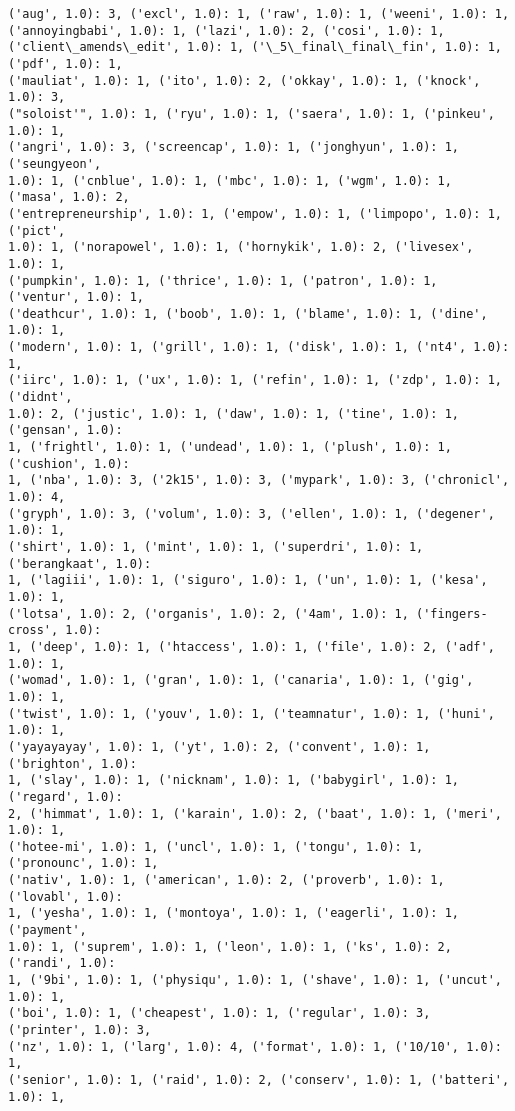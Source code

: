 \documentclass[11pt]{article}
\begin{document}
\begin{Verbatim}[commandchars=\\\{\}]
('aug', 1.0): 3, ('excl', 1.0): 1, ('raw', 1.0): 1, ('weeni', 1.0): 1,
('annoyingbabi', 1.0): 1, ('lazi', 1.0): 2, ('cosi', 1.0): 1,
('client\_amends\_edit', 1.0): 1, ('\_5\_final\_final\_fin', 1.0): 1, ('pdf', 1.0): 1,
('mauliat', 1.0): 1, ('ito', 1.0): 2, ('okkay', 1.0): 1, ('knock', 1.0): 3,
("soloist'", 1.0): 1, ('ryu', 1.0): 1, ('saera', 1.0): 1, ('pinkeu', 1.0): 1,
('angri', 1.0): 3, ('screencap', 1.0): 1, ('jonghyun', 1.0): 1, ('seungyeon',
1.0): 1, ('cnblue', 1.0): 1, ('mbc', 1.0): 1, ('wgm', 1.0): 1, ('masa', 1.0): 2,
('entrepreneurship', 1.0): 1, ('empow', 1.0): 1, ('limpopo', 1.0): 1, ('pict',
1.0): 1, ('norapowel', 1.0): 1, ('hornykik', 1.0): 2, ('livesex', 1.0): 1,
('pumpkin', 1.0): 1, ('thrice', 1.0): 1, ('patron', 1.0): 1, ('ventur', 1.0): 1,
('deathcur', 1.0): 1, ('boob', 1.0): 1, ('blame', 1.0): 1, ('dine', 1.0): 1,
('modern', 1.0): 1, ('grill', 1.0): 1, ('disk', 1.0): 1, ('nt4', 1.0): 1,
('iirc', 1.0): 1, ('ux', 1.0): 1, ('refin', 1.0): 1, ('zdp', 1.0): 1, ('didnt',
1.0): 2, ('justic', 1.0): 1, ('daw', 1.0): 1, ('tine', 1.0): 1, ('gensan', 1.0):
1, ('frightl', 1.0): 1, ('undead', 1.0): 1, ('plush', 1.0): 1, ('cushion', 1.0):
1, ('nba', 1.0): 3, ('2k15', 1.0): 3, ('mypark', 1.0): 3, ('chronicl', 1.0): 4,
('gryph', 1.0): 3, ('volum', 1.0): 3, ('ellen', 1.0): 1, ('degener', 1.0): 1,
('shirt', 1.0): 1, ('mint', 1.0): 1, ('superdri', 1.0): 1, ('berangkaat', 1.0):
1, ('lagiii', 1.0): 1, ('siguro', 1.0): 1, ('un', 1.0): 1, ('kesa', 1.0): 1,
('lotsa', 1.0): 2, ('organis', 1.0): 2, ('4am', 1.0): 1, ('fingers-cross', 1.0):
1, ('deep', 1.0): 1, ('htaccess', 1.0): 1, ('file', 1.0): 2, ('adf', 1.0): 1,
('womad', 1.0): 1, ('gran', 1.0): 1, ('canaria', 1.0): 1, ('gig', 1.0): 1,
('twist', 1.0): 1, ('youv', 1.0): 1, ('teamnatur', 1.0): 1, ('huni', 1.0): 1,
('yayayayay', 1.0): 1, ('yt', 1.0): 2, ('convent', 1.0): 1, ('brighton', 1.0):
1, ('slay', 1.0): 1, ('nicknam', 1.0): 1, ('babygirl', 1.0): 1, ('regard', 1.0):
2, ('himmat', 1.0): 1, ('karain', 1.0): 2, ('baat', 1.0): 1, ('meri', 1.0): 1,
('hotee-mi', 1.0): 1, ('uncl', 1.0): 1, ('tongu', 1.0): 1, ('pronounc', 1.0): 1,
('nativ', 1.0): 1, ('american', 1.0): 2, ('proverb', 1.0): 1, ('lovabl', 1.0):
1, ('yesha', 1.0): 1, ('montoya', 1.0): 1, ('eagerli', 1.0): 1, ('payment',
1.0): 1, ('suprem', 1.0): 1, ('leon', 1.0): 1, ('ks', 1.0): 2, ('randi', 1.0):
1, ('9bi', 1.0): 1, ('physiqu', 1.0): 1, ('shave', 1.0): 1, ('uncut', 1.0): 1,
('boi', 1.0): 1, ('cheapest', 1.0): 1, ('regular', 1.0): 3, ('printer', 1.0): 3,
('nz', 1.0): 1, ('larg', 1.0): 4, ('format', 1.0): 1, ('10/10', 1.0): 1,
('senior', 1.0): 1, ('raid', 1.0): 2, ('conserv', 1.0): 1, ('batteri', 1.0): 1,

\end{Verbatim}
\end{document}
